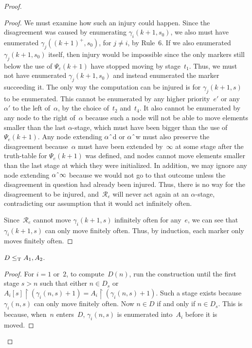 \documentclass{LMCS}
\def\res{\!\!\upharpoonright\!}     \def\eres{\!\upharpoonright\!}     \def\nes{n_{e,s}}
\newcommand{\0}{\mathbf{0}}
\newcommand\leT{\leq_{\rm T}}
\newcommand{\<}{\langle}
\renewcommand{\>}{\rangle}
\newcommand{\concat}{\symbol{94}}
\begin{document}
\begin{proof}
\begin{proof}
We must examine how such an injury could happen.  Since the disagreement was
caused by enumerating $\gamma_i(k+1,s_0)$, we also must have enumerated
\mbox{$\gamma_j((k+1)^+,s_0)$,} for $j\neq i$, by Rule~6.  If we also
enumerated $\gamma_j(k+1,s_0)$ itself, then injury would be impossible since
the only markers still below the use of $\Psi_e(k+1)$ have stopped moving by
stage~$t_1$.  Thus, we must not have enumerated $\gamma_j(k+1,s_0)$ and
instead enumerated the marker succeeding it.  The only way the computation
can be injured is for $\gamma_j(k+1,s)$ to be enumerated. This cannot be
enumerated by any higher priority~$e'$ or any~$\alpha'$ to the left
of~$\alpha$, by the choice of~$t_2$ and~$t_4$.  It also cannot be enumerated
by any node to the right of~$\alpha$ because such a node will not be able to
move elements smaller than the last $\alpha$-stage, which must have been
bigger than the use of $\Psi_e(k+1)$.  Any node extending $\alpha\concat$d or
$\alpha\concat$w must also preserve the disagreement because~$\alpha$ must
have been extended by~$\infty$ at some stage after the truth-table for
$\Psi_e(k+1)$ was defined, and nodes cannot move elements smaller than the
last stage at which they were initialized.  In addition, we may ignore any
node extending $\alpha\concat\infty$ because we would not go to that outcome
unless the disagreement in question had already been injured.  Thus, there is
no way for the disagreement to be injured, and~$\mathcal R_e$ will never act
again at an $\alpha$-stage, contradicting our assumption that it would act
infinitely often.

Since~$\mathcal R_e$ cannot move $\gamma_i(k+1,s)$ infinitely often for
any~$e$, we can see that $\gamma_i(k+1,s)$ can only move finitely often.
Thus, by induction, each marker only moves finitely often.
\end{proof}

\begin{lem}
$D \leT A_1, A_2$.
\end{lem}

\begin{proof}
For $i=1$ or~$2$, to compute~$D(n)$, run the construction until the first
stage $s>n$ such that either $n\in D_s$ or $A_i[s] \res (\gamma_i(n,s)+1)
=A_{i} \res (\gamma_i(n,s)+1)$.  Such a stage exists because
$\gamma_i(n,s)$ can only move finitely often.  Now $n \in D$ if and only if
$n \in D_s$.  This is because, when~$n$ enters~$D$, $\gamma_i(n,s)$ is
enumerated into~$A_i$ before it is moved.
\end{proof}


\end{proof}
\end{document}
